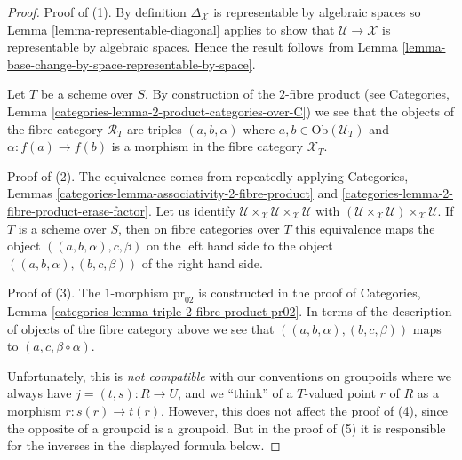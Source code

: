 \begin{proof}
Proof of (1). By definition $\Delta_{\mathcal{X}}$ is representable
by algebraic spaces so
Lemma \ref{lemma-representable-diagonal}
applies to show that $\mathcal{U} \to \mathcal{X}$ is representable
by algebraic spaces. Hence the result follows from
Lemma \ref{lemma-base-change-by-space-representable-by-space}.

\medskip\noindent
Let $T$ be a scheme over $S$. By construction of the $2$-fibre product (see
Categories, Lemma \ref{categories-lemma-2-product-categories-over-C})
we see that the objects of the fibre category $\mathcal{R}_T$
are triples $(a, b, \alpha)$ where $a, b \in \text{Ob}(\mathcal{U}_T)$
and $\alpha : f(a) \to f(b)$
is a morphism in the fibre category $\mathcal{X}_T$.

\medskip\noindent
Proof of (2). The equivalence comes from repeatedly applying
Categories, Lemmas \ref{categories-lemma-associativity-2-fibre-product} and
\ref{categories-lemma-2-fibre-product-erase-factor}.
Let us identify
$\mathcal{U} \times_{\mathcal{X}} \mathcal{U} \times_{\mathcal{X}} \mathcal{U}$
with
$(\mathcal{U} \times_{\mathcal{X}} \mathcal{U})
\times_{\mathcal{X}} \mathcal{U}$.
If $T$ is a scheme over $S$, then on fibre categories over $T$
this equivalence maps the object
$((a,b, \alpha), c, \beta)$ on the left hand side
to the object $((a, b, \alpha), (b, c, \beta))$ of the right hand side.

\medskip\noindent
Proof of (3). The $1$-morphism $\text{pr}_{02}$ is constructed in the proof of
Categories, Lemma \ref{categories-lemma-triple-2-fibre-product-pr02}.
In terms of the description of objects of the fibre category
above we see that $((a, b, \alpha), (b, c, \beta))$
maps to $(a, c, \beta \circ \alpha)$.

\medskip\noindent
Unfortunately, this is {\it not compatible} with our conventions on
groupoids where we always have $j = (t, s) : R \to U$, and we ``think''
of a $T$-valued point $r$ of $R$ as a morphism $r : s(r) \to t(r)$.
However, this does not affect the proof of (4), since the opposite of
a groupoid is a groupoid. But in the proof of (5) it is responsible
for the inverses in the displayed formula below.


\end{proof}
